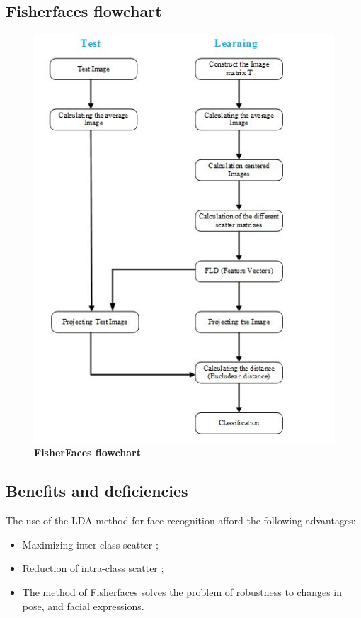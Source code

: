 \subsection{Fisherfaces flowchart }
\begin{figure}[bth]%
\begin{center}
\includegraphics[scale=0.85]{test_learn}%
\caption{\textbf{FisherFaces flowchart}}%
\label{test_learn}%
\end {center}
\end{figure}

\subsection{Benefits and deficiencies}
The use of the LDA method for face recognition afford the following advantages:
\begin{itemize}
\item Maximizing inter-class scatter ;
\item Reduction of intra-class scatter ;
\item The method of Fisherfaces solves the problem of robustness to changes in pose, and facial expressions.
\end{itemize}

